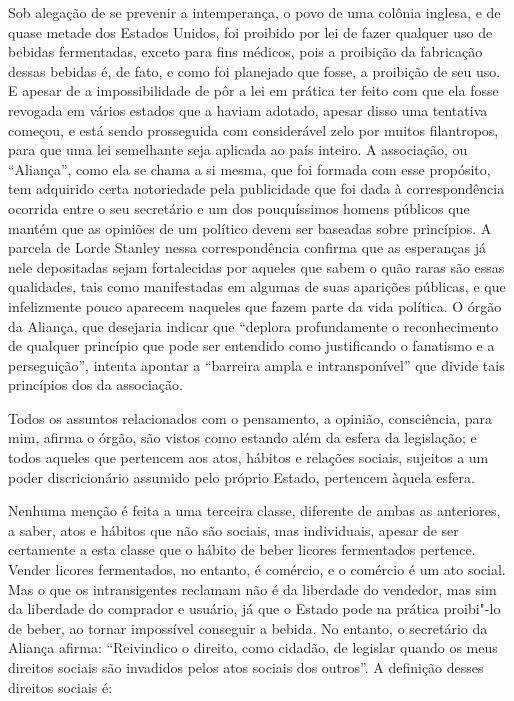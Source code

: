 Sob alegação de se prevenir a intemperança, o povo de uma colônia
inglesa, e de quase metade dos Estados Unidos, foi proibido por lei de
fazer qualquer uso de bebidas fermentadas, exceto para fins médicos,
pois a proibição da fabricação dessas bebidas é, de fato, e como foi
planejado que fosse, a proibição de seu uso. E apesar de a
impossibilidade de pôr a lei em prática ter feito com que ela fosse
revogada em vários estados que a haviam adotado, apesar disso uma
tentativa começou, e está sendo prosseguida com considerável zelo por
muitos filantropos, para que uma lei semelhante seja aplicada ao
país inteiro. A associação, ou ``Aliança'', como ela se chama a si mesma,
que foi formada com esse propósito, tem adquirido certa notoriedade pela
publicidade que foi dada à correspondência ocorrida entre o seu
secretário e um dos pouquíssimos homens públicos que mantém que as
opiniões de um político devem ser baseadas sobre princípios. A parcela
de Lorde Stanley nessa correspondência confirma que as esperanças já
nele depositadas sejam fortalecidas por aqueles que sabem o quão raras
são essas qualidades, tais como \mbox{manifestadas} em algumas de suas aparições
públicas, e que infelizmente pouco aparecem naqueles que fazem parte da
vida política. O órgão da Aliança, que desejaria indicar que ``deplora
profundamente o reconhecimento de qualquer princípio que pode ser
entendido como justificando o fanatismo e a perseguição'', intenta
apontar a ``barreira ampla e intransponível'' que divide tais princípios
dos da associação. 

\begin{hedraquote}
Todos os assuntos relacionados com o pensamento, a
opinião, consciência, para mim, afirma o órgão, são vistos como
estando além da esfera da legislação; e todos aqueles que pertencem aos
atos, hábitos e relações sociais, sujeitos a um poder discricionário
assumido pelo próprio Estado, pertencem àquela esfera. 
\end{hedraquote}

Nenhuma menção é
feita a uma terceira classe, diferente de ambas as anteriores, a saber,
atos e hábitos que não são sociais, mas individuais, apesar de ser
certamente a esta classe que o hábito de beber licores fermentados
pertence. Vender licores fermentados, no entanto, é comércio, e o
comércio é um ato social. Mas o que os intransigentes reclamam não é da
liberdade do vendedor, mas sim da liberdade do comprador e usuário, já
que o Estado pode na prática proibi"-lo de beber, ao tornar
impossível conseguir a bebida. No entanto,
o secretário da Aliança afirma: ``Reivindico o direito, como cidadão, de
legislar quando os meus direitos sociais são invadidos pelos atos
sociais dos outros''. A definição desses direitos sociais é: 

